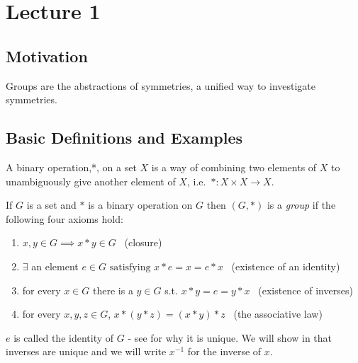 
\hypertarget{lecture-1}{%
\section{Lecture 1}\label{lecture-1}}

\hypertarget{motivation}{%
\subsection{Motivation}\label{motivation}}

Groups are the abstractions of symmetries, a unified way to investigate symmetries.

\hypertarget{basic-definitions-and-examples}{%
\subsection{Basic Definitions and Examples}\label{basic-definitions-and-examples}}

\begin{definition}
  A binary operation,*, on a set \(X\) is a way of combining two elements of \(X\) to unambiguously give another element of \(X\),
i.e.~\(*: X \times X \to X\).
\end{definition} 

\begin{definition}[Group]

If \(G\) is a set and \(*\) is a binary operation on \(G\) then \((G, *)\) is a \emph{group} if the following four axioms hold:

\begin{enumerate}
\def\labelenumi{\arabic{enumi}.}
\item
  \(x, y \in G \implies x * y \in G\) \hfill~{(closure)}
\item
  \(\exists\) an element \(e \in G \text{ satisfying } x * e = x = e * x\) \hfill~{(existence of an identity)}
\item
  for every \(x \in G\) there is a \(y \in G\) s.t. \(x * y = e = y * x\) \hfill~{(existence of inverses)}
\item
  for every \(x, y, z \in G\), \(x * (y * z) = (x * y) * z\) \hfill~{(the associative law)}
\end{enumerate}

\end{definition}

\begin{remark}
\(e\) is called the identity of \(G\) - see  for why it is unique.
We will show in  that inverses are unique and we will write \(x^{-1}\) for the inverse of \(x\).
\end{remark}

